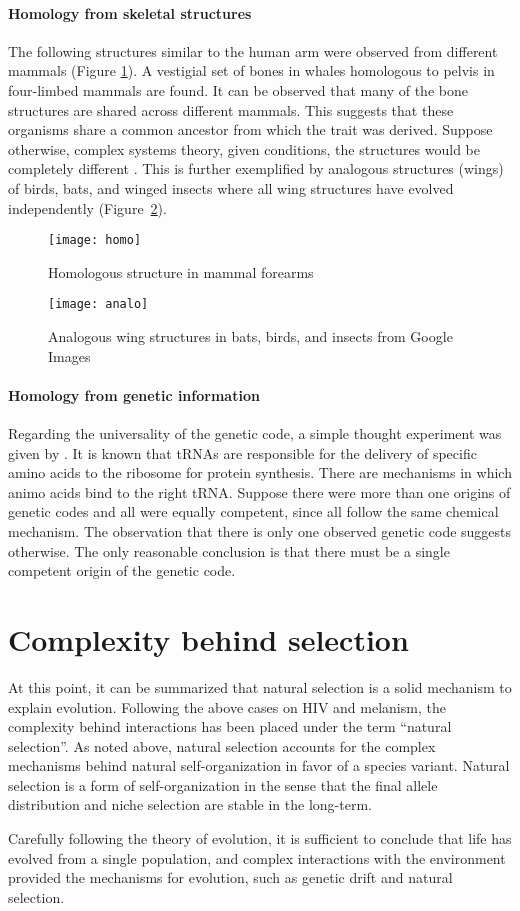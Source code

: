 \paragraph{Homology from skeletal structures}
The following structures similar to the human arm were observed from different mammals \cite{biomain} (Figure \ref{fig:homo}).
A vestigial set of bones in whales homologous to pelvis in four-limbed mammals are found.
It can be observed that many of the bone structures are shared across different mammals.
This suggests that these organisms share a common ancestor from which the trait was derived.
Suppose otherwise, complex systems theory, given conditions, the structures would be completely different \cite{Ridley}.
This is further exemplified by analogous structures (wings) of birds, bats, and winged insects where all wing structures have evolved independently (Figure~\ref{fig:analo}).

\begin{figure}[h]
    \centering
    \texttt{[image: homo]}
    \caption{Homologous structure in mammal forearms}
    \label{fig:homo}
\end{figure}

\begin{figure}[h]
    \centering
    \texttt{[image: analo]}
    \caption{Analogous wing structures in bats, birds, and insects from Google Images}
    \label{fig:analo}
\end{figure}

\paragraph{Homology from genetic information}
Regarding the universality of the genetic code, a simple thought experiment was given by .
It is known that tRNAs are responsible for the delivery of specific amino acids to the ribosome for protein synthesis.
There are mechanisms in which animo acids bind to the right tRNA.
Suppose there were more than one origins of genetic codes and all were equally competent, since all follow the same chemical mechanism.
The observation that there is only one observed genetic code suggests otherwise.
The only reasonable conclusion is that there must be a single competent origin of the genetic code.

\section{Complexity behind selection}
At this point, it can be summarized that natural selection is a solid mechanism to explain evolution.
Following the above cases on HIV and melanism, the complexity behind interactions has been placed under the term ``natural selection''.
As noted above, natural selection accounts for the complex mechanisms behind natural self-organization in favor of a species variant.
Natural selection is a form of self-organization in the sense that the final allele distribution and niche selection are stable in the long-term.

Carefully following the theory of evolution, it is sufficient to conclude that life has evolved from a single population, and complex interactions with the environment provided the mechanisms for evolution, such as genetic drift and natural selection.
